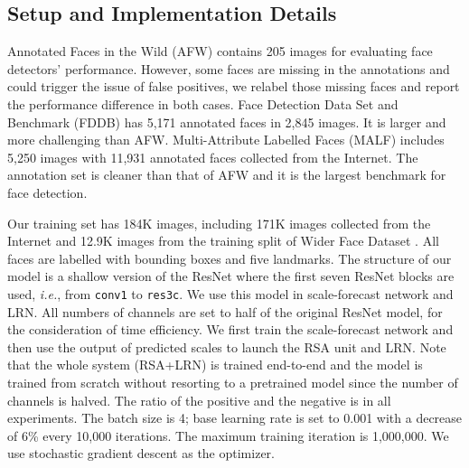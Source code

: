 \documentclass[10pt,twocolumn,letterpaper]{article}
\begin{document}
\subsection{Setup and Implementation Details}
\label{sec:setup-and-implementation-details}
Annotated Faces in the Wild (AFW) \cite{Zhu2012Face} contains 205 images for evaluating face detectors' performance. 
However, some faces are missing in the annotations and could trigger the issue of false positives, we relabel those missing faces and report the performance difference in both cases.
Face Detection Data Set and Benchmark (FDDB) \cite{fddbTech} has 5,171 annotated faces in 2,845 images. It is larger and more challenging than AFW. 
Multi-Attribute Labelled Faces (MALF) \cite{faceevaluation15} includes 5,250 images with 11,931 annotated faces collected from the Internet. The annotation set is cleaner than that of AFW and it is the largest benchmark for face detection. 

Our training set has 184K images, including 171K images collected from the Internet and 12.9K images from the  training split of Wider Face Dataset \cite{yang2016wider}. All faces are labelled with bounding boxes and five landmarks. The structure of our model is a shallow version of the ResNet \cite{resNet} where the first seven ResNet blocks are used, \textit{i.e.}, from \texttt{conv1} to \texttt{res3c}. We use this model in scale-forecast network and LRN.
All numbers of channels are set to half of the original ResNet model, for the consideration of time efficiency. 
We first train the scale-forecast network and then use the output of predicted scales to launch the RSA unit and LRN. 
Note that the whole system (RSA+LRN) is trained end-to-end and the model is trained from scratch without resorting to a pretrained model since the number of channels is halved. 
The ratio of the positive and the negative is  in all experiments. 
The batch size is 4; base learning rate is set to 0.001 with a decrease of 6\% every 10,000 iterations. The maximum training iteration is 1,000,000. We use stochastic gradient descent as the optimizer.
\end{document}
